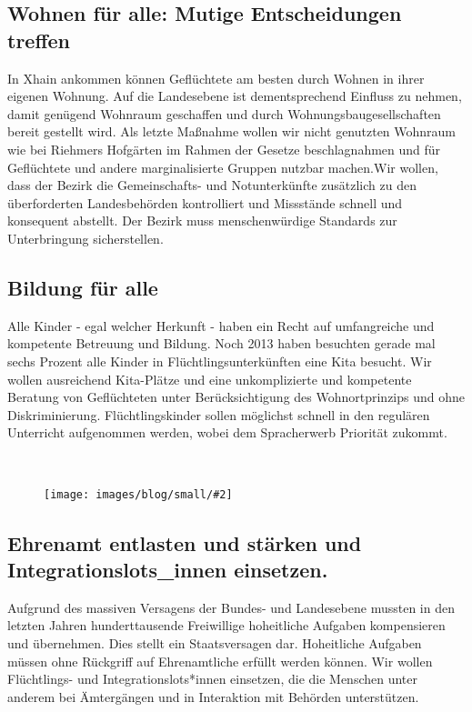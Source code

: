 \documentclass[a4paper,10pt]{article}
\newcommand{\mysection}[1]{{\vspace{1cm}\noindent\color{gray}{\ttfamily\LARGE\raggedright #1}\\\medskip}}
\newcommand{\abschnitt}[2]{%
\mysection{\raggedright #1}%
\begin{figure}[t]%
\vspace*{-2.7cm}%
\hspace*{-2.1cm}%
\texttt{[image: images/blog/small/\#2]} %
\end{figure}%
}
\begin{document}
\subsection*{\ttfamily Wohnen für alle: Mutige Entscheidungen
treffen}\label{wohnen-fuxfcr-alle-mutige-entscheidungen-treffen}

In Xhain ankommen können Geflüchtete am besten durch Wohnen in ihrer
eigenen Wohnung. Auf die Landesebene ist dementsprechend Einfluss zu
nehmen, damit genügend Wohnraum geschaffen und durch
Wohnungsbaugesellschaften bereit gestellt wird. Als letzte Maßnahme
wollen wir nicht genutzten Wohnraum wie bei Riehmers Hofgärten im Rahmen
der Gesetze beschlagnahmen und für Geflüchtete und andere
marginalisierte Gruppen nutzbar machen.Wir wollen, dass der Bezirk die
Gemeinschafts- und Notunterkünfte zusätzlich zu den überforderten
Landesbehörden kontrolliert und Missstände schnell und konsequent
abstellt. Der Bezirk muss menschenwürdige Standards zur Unterbringung
sicherstellen.

\subsection*{\ttfamily Bildung für alle}\label{bildung-fuxfcr-alle}

Alle Kinder - egal welcher Herkunft - haben ein Recht auf umfangreiche
und kompetente Betreuung und Bildung. Noch 2013 haben besuchten gerade
mal sechs Prozent alle Kinder in Flüchtlingsunterkünften eine Kita
besucht. Wir wollen ausreichend Kita-Plätze und eine unkomplizierte und
kompetente Beratung von Geflüchteten unter Berücksichtigung des
Wohnortprinzips und ohne Diskriminierung. Flüchtlingskinder sollen
möglichst schnell in den regulären Unterricht aufgenommen werden, wobei
dem Spracherwerb Priorität zukommt.

\clearpage
\abschnitt{}{racistyouare.png}
\subsection*{\ttfamily Ehrenamt entlasten und stärken und Integrationslots\_innen
einsetzen.}\label{ehrenamt-entlasten-und-stuxe4rken-und-integrationslotsinnen-einsetzen.}

Aufgrund des massiven Versagens der Bundes- und Landesebene mussten in
den letzten Jahren hunderttausende Freiwillige hoheitliche Aufgaben
kompensieren und übernehmen. Dies stellt ein Staatsversagen dar.
Hoheitliche Aufgaben müssen ohne Rückgriff auf Ehrenamtliche erfüllt
werden können. Wir wollen Flüchtlings- und Integrationslots*innen
einsetzen, die die Menschen unter anderem bei Ämtergängen und in
Interaktion mit Behörden unterstützen.
\end{document}
